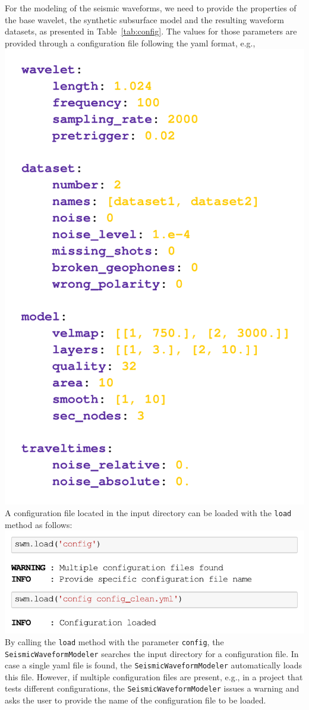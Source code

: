 \documentclass[a4paper,fleqn]{cas-sc}
\begin{document}
For the modeling of the seismic waveforms, we need to provide the properties of the base wavelet, the synthetic subsurface model and the resulting waveform datasets, as presented in Table~\ref{tab:config}. The values for those parameters are provided through a configuration file following the yaml format, e.g.,
\newline
\includegraphics[width=.3\textwidth]{./figures/yaml_file.pdf}
\newline
A configuration file located in the input directory can be loaded with the \texttt{load} method as follows:
\newline
\includegraphics[width=.5\textwidth]{./figures/load_config.pdf}
\newline
By calling the \texttt{load} method with the parameter \texttt{config}, the \texttt{SeismicWaveformModeler} searches the input directory for a configuration file. 
In case a single yaml file is found, the \texttt{SeismicWaveformModeler} automatically loads this file. However, if multiple configuration files are present, e.g., in a project that tests different configurations, the \texttt{SeismicWaveformModeler} issues a warning and asks the user to provide the name of the configuration file to be loaded.
\end{document}
